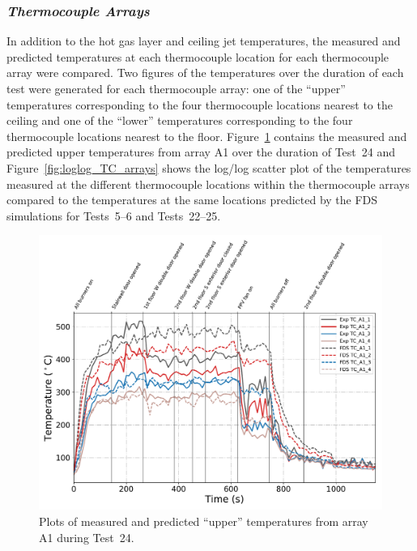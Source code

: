 \subsubsection*{\textit{Thermocouple Arrays}}
In addition to the hot gas layer and ceiling jet temperatures, the measured and predicted temperatures at each thermocouple location for each thermocouple array were compared. Two figures of the temperatures over the duration of each test were generated for each thermocouple array: one of the ``upper'' temperatures corresponding to the four thermocouple locations nearest to the ceiling and one of the ``lower'' temperatures corresponding to the four thermocouple locations nearest to the floor. Figure~\ref{fig:TCarray_data} contains the measured and predicted upper temperatures from array A1 over the duration of Test~24 and Figure~\ref{fig:loglog_TC_arrays} shows the log/log scatter plot of the temperatures measured at the different thermocouple locations within the thermocouple arrays compared to the temperatures at the same locations predicted by the FDS simulations for Tests~5--6 and Tests~22--25.
\begin{figure}[!h]
	\centering
	\includegraphics[width=\columnwidth]{Figures/Plots/Validation/Temperature/Test_24_TC_A1_upper}
	\caption[Plot of the measured and predicted upper temperatures from array A1 during Test~24.]{Plots of measured and predicted ``upper'' temperatures from array A1 during Test~24.}
	\label{fig:TCarray_data}
\end{figure}

